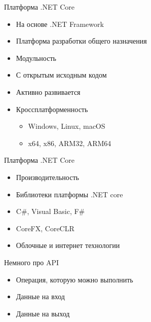 \documentclass[14pt,pdf,hyperref={unicode}]{beamer}
\begin{document}
\begin{frame}{Платформа .NET Core}
\begin{itemize}
    \item На основе .NET Framework
    \item Платформа разработки общего назначения
    \item Модульность
    \item С открытым исходным кодом
    \item Активно развивается
    \item Кроссплатформенность
    \begin{itemize}
        \item Windows, Linux, macOS
        \item x64, x86, ARM32, ARM64
    \end{itemize}
\end{itemize}
    
\end{frame}

\begin{frame}{Платформа .NET Core}
\begin{itemize}
    \item Производительность
    \item Библиотеки платформы .NET core
    \item C\#, Visual Basic, F\#
    \item CoreFX, CoreCLR
    \item Облочные и интернет технологии
\end{itemize}
    
\end{frame}

\begin{frame}{Немного про API}
\begin{itemize}
    \item Операция, которую можно выполнить
    \item Данные на вход
    \item Данные на выход
\end{itemize}
\end{frame}
\end{document}
